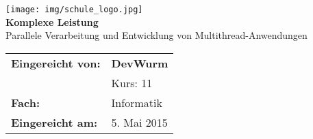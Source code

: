 \begin{center}

\texttt{[image: img/schule\_logo.jpg]}
\\[4.5cm]

\huge{\textbf{Komplexe Leistung}}\\[0.25cm]
\Large{Parallele Verarbeitung und Entwicklung von Multithread-Anwendungen}
\\[4.5cm]

\begin{tabular}{ll}
\textbf{Eingereicht von:} &  \textbf{DevWurm}\\[0.25cm]
& Kurs: 11\\[0.25cm]
\textbf{Fach:} & Informatik\\[0.25cm]
\textbf{Eingereicht am: } & 5. Mai 2015
\end{tabular}
\end{center}